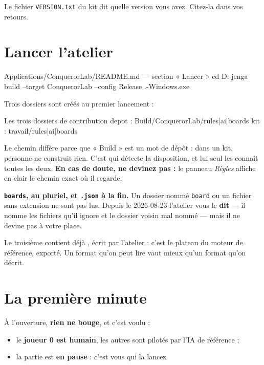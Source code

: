 Le fichier \texttt{VERSION.txt} du kit dit quelle version vous avez. Citez-la
dans vos retours.

\section{Lancer l'atelier}

\begin{nkcode}{Applications/ConquerorLab/README.md — section « Lancer »}
cd D:\Projets{}\Nkentseu\Nkentseu
jenga build --target ConquerorLab --config Release
.\Build\Bin\Release-Windows\ConquerorLab\ConquerorLab.exe
\end{nkcode}

Trois dossiers sont créés au premier lancement :

\begin{nkcode}{Les trois dossiers de contribution}
depot :   Build/ConquerorLab/rules|ai|boards
kit   :   travail/rules|ai|boards
\end{nkcode}

Le chemin diffère parce que « Build » est un mot de dépôt : dans un kit, personne
ne construit rien. C'est  qui détecte la disposition, et lui
seul les connaît toutes les deux. \textbf{En cas de doute, ne devinez pas :} le
panneau \emph{Règles} affiche en clair le chemin exact où il regarde.

\textbf{\texttt{boards}, au pluriel, et \texttt{.json} à la fin.} Un dossier
nommé \texttt{board} ou un fichier sans extension ne sont pas lus. Depuis le
2026-08-23 l'atelier vous le \textbf{dit} --- il nomme les fichiers qu'il ignore
et le dossier voisin mal nommé --- mais il ne devine pas à votre place.

Le troisième contient déjà , écrit par
l'atelier : c'est le plateau du moteur de référence, exporté. Un format qu'on
peut lire vaut mieux qu'un format qu'on décrit.

\section{La première minute}

À l'ouverture, \textbf{rien ne bouge}, et c'est voulu :

\begin{itemize}
  \item le \textbf{joueur 0 est humain}, les autres sont pilotés par l'IA de
        référence ;
  \item la partie est \textbf{en pause} : c'est vous qui la lancez.
\end{itemize}

